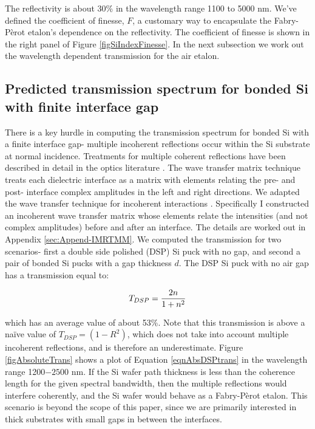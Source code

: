 \documentclass[osajnl,preprint,showpacs,superscriptaddress,12pt]{revtex4-1} %
\begin{document}
The reflectivity is about 30\% in the wavelength range 1100 to 5000 nm.  We've defined the coefficient of finesse\cite{2007fuph.book.....S}, $F$, a customary way to encapsulate the Fabry-P\`{e}rot etalon's dependence on the reflectivity.  The coefficient of finesse is shown in the right panel of Figure \ref{figSiIndexFinesse}.  In the next subsection we work out the wavelength dependent transmission for the air etalon.


\subsection{Predicted transmission spectrum for bonded Si with finite interface gap}
\label{secTheory}
There is a key hurdle in computing the transmission spectrum for bonded Si with a finite interface gap- multiple incoherent reflections occur within the Si substrate at normal incidence.  Treatments for multiple coherent reflections have been described in detail in the optics literature \cite{2007fuph.book.....S}.  The wave transfer matrix technique treats each dielectric interface as a matrix with elements relating the pre- and post- interface complex amplitudes in the left and right directions.  We adapted the wave transfer technique for incoherent interactions \cite{2002ApOpt..41.3978K}.  Specifically I constructed an incoherent wave transfer matrix whose elements relate the intensities (and not complex amplitudes) before and after an interface.  The details are worked out in Appendix \ref{sec:Append-IMRTMM}.  We computed the transmission for two scenarios- first a double side polished (DSP) Si puck with no gap, and second a pair of bonded Si pucks with a gap thickness $d$.  The DSP Si puck with no air gap has a transmission equal to:

$$
T_{DSP} = \frac{2n}{1+n^2} \label{eqnAbsDSPtrans} \\
$$

which has an average value of about 53\%.  Note that this transmission is above a na\"ive value of $T_{DSP}=(1-R^2)$, which does not take into account multiple incoherent reflections, and is therefore an underestimate.  Figure \ref{figAbsoluteTrans} shows a plot of Equation \ref{eqnAbsDSPtrans} in the wavelength range 1200$-2500$ nm.  If the Si wafer path thickness is less than the coherence length for the given spectral bandwidth, then the multiple reflections would interfere coherently, and the Si wafer would behave as a Fabry-P\`erot etalon.  This scenario is beyond the scope of this paper, since we are primarily interested in thick substrates with small gaps in between the interfaces.%
\end{document}
